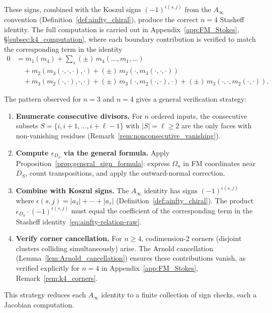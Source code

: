 These signs, combined with the Koszul signs $(-1)^{\epsilon(s,j)}$ from the $A_\infty$ convention (Definition~\ref{def:ainfty_chiral}), produce the correct $n = 4$ Stasheff identity. The full computation is carried out in Appendix~\ref{app:FM_Stokes}, \S\ref{subsec:k4_computation}, where each boundary contribution is verified to match the corresponding term in the identity
\begin{align*}
0 &= m_1(m_4) + \sum_{s} (\pm)\, m_4(\ldots, m_1, \ldots) \\
&\quad + m_2(m_3(\cdot,\cdot,\cdot),\cdot) + (\pm)\, m_2(\cdot, m_3(\cdot,\cdot,\cdot)) \\
&\quad + m_3(m_2(\cdot,\cdot),\cdot,\cdot) + (\pm)\, m_3(\cdot, m_2(\cdot,\cdot),\cdot) + (\pm)\, m_3(\cdot,\cdot, m_2(\cdot,\cdot)).
\end{align*}

\begin{remark}
\label{rem:general_verification}
The pattern observed for $n = 3$ and $n = 4$ gives a general verification strategy:
\begin{enumerate}[label=(\arabic*)]
\item \textbf{Enumerate consecutive divisors.} For $n$ ordered inputs, the consecutive subsets $S = \{i, i+1, \ldots, i+\ell-1\}$ with $|S| = \ell \geq 2$ are the only faces with non-vanishing residues (Remark~\ref{rem:nonconsecutive_vanishing}).
\item \textbf{Compute $\epsilon_{D_S}$ via the general formula.} Apply Proposition~\ref{prop:general_sign_formula}: express $\Omega_n$ in FM coordinates near $D_S$, count transpositions, and apply the outward-normal correction.
\item \textbf{Combine with Koszul signs.} The $A_\infty$ identity has signs $(-1)^{\epsilon(s,j)}$ where $\epsilon(s,j) = |a_1| + \cdots + |a_s|$ (Definition~\ref{def:ainfty_chiral}). The product $\epsilon_{D_S} \cdot (-1)^{\epsilon(s,j)}$ must equal the coefficient of the corresponding term in the Stasheff identity~\eqref{eq:ainfty-relation-raw}.
\item \textbf{Verify corner cancellation.} For $n \geq 4$, codimension-2 corners (disjoint clusters colliding simultaneously) arise. The Arnold cancellation (Lemma~\ref{lem:Arnold_cancellation}) ensures these contributions vanish, as verified explicitly for $n = 4$ in Appendix~\ref{app:FM_Stokes}, Remark~\ref{rem:k4_corners}.
\end{enumerate}
This strategy reduces each $A_\infty$ identity to a finite collection of sign checks, each a Jacobian computation.
\end{remark}

